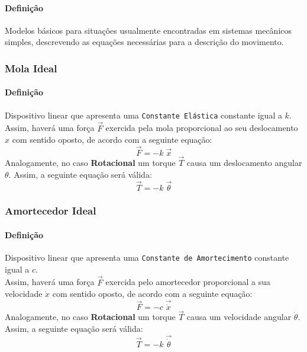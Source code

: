 \documentclass{article}
\begin{document}
    \paragraph{Definição}Modelos básicos para situações usualmente encontradas em sistemas mecânicos simples, descrevendo as equações necessárias para a descrição do movimento.
    \begin{multicols}{2}
        \raggedcolumns
        \subsubsection{Mola Ideal}
            \paragraph{Definição}Dispositivo linear que apresenta uma \texttt{Constante Elástica} constante igual a $k$.\\

            Assim, haverá uma força $\vec{F}$ exercida pela mola proporcional ao seu deslocamento $x$ com sentido oposto, de acordo com a seguinte equação:
                \begin{equation}
                    \boxed{
                        \vec{F} = - k\;\vec{x}
                    }
                \end{equation}
            Analogamente, no caso \textbf{Rotacional} um torque $\vec{T}$ causa um deslocamento angular $\theta$. Assim, a seguinte equação será válida:
                \begin{equation}
                    \boxed{
                        \vec{T} = - k\;\vec{\theta}
                    }
                \end{equation}

        \columnbreak

        \subsubsection{Amortecedor Ideal}
            \paragraph{Definição}Dispositivo linear que apresenta uma \texttt{Constante de Amortecimento} constante igual a $c$.\\

            Assim, haverá uma força $\vec{F}$ exercida pelo amortecedor  proporcional a sua velocidade $\dot{x}$ com sentido oposto, de acordo com a seguinte equação:
                \begin{equation}
                    \boxed{
                        \vec{F} = - c\;\vec{\dot{x}}
                    }
                \end{equation}
            Analogamente, no caso \textbf{Rotacional} um torque $\vec{T}$ causa um velocidade angular $\dot{\theta}$. Assim, a seguinte equação será válida:
                \begin{equation}
                    \boxed{
                        \vec{T} = - k\;\vec{\dot{\theta}}
                    }
                \end{equation}
    \end{multicols}\noindent
\end{document}
